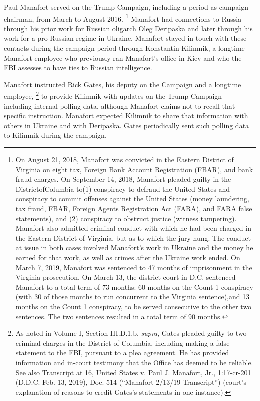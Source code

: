 Paul Manafort served on the Trump Campaign, including a period as campaign chairman, from March to August 2016.%
\footnote{On August 21, 2018, Manafort was convicted in the Eastern District of Virginia on eight tax, Foreign Bank Account Registration (FBAR), and bank fraud charges. On September 14, 2018, Manafort pleaded guilty in the DistrictofColumbia to(1) conspiracy to defraud the United States and conspiracy to commit offenses against the United States (money laundering, tax fraud, FBAR, Foreign Agents Registration Act (FARA), and FARA false statements), and (2) conspiracy to obstruct justice (witness tampering).
Manafort also admitted criminal conduct with which he had been charged in the Eastern District of Virginia, but as to which the jury hung.
The conduct at issue in both cases involved Manafort’s work in Ukraine and the money he earned for that work, as well as crimes after the Ukraine work ended. On March 7, 2019, Manafort was sentenced to 47 months of imprisonment in the Virginia prosecution.
On March 13, the district court in D.C. sentenced Manafort to a total term of 73 months: 60 months on the Count 1 conspiracy (with 30 of those months to run concurrent to the Virginia sentence),and 13 months on the Count 1 conspiracy, to be served consecutive to the other two sentences.
The two sentences resulted in a total term of 90 months.
}
Manafort had connections to Russia through his prior work for Russian oligarch Oleg Deripaska and later through his work for a pro-Russian regime in Ukraine.
Manafort stayed in touch with these contacts during the campaign period through Konstantin Kilimnik, a longtime Manafort employee who previously ran Manafort's office in Kiev and who the FBI assesses to have ties to Russian intelligence.

Manafort instructed Rick Gates, his deputy on the Campaign and a longtime employee, %
\footnote{As noted in Volume I, Section III.D.1.b, \textit{supra}, Gates pleaded guilty to two criminal charges in the District of Columbia, including making a false statement to the FBI, pursuant to a plea agreement.
He has provided information and in-court testimony that the Office has deemed to be reliable. See also Transcript at 16, United States v. Paul J. Manafort, Jr., 1:17-cr-201 (D.D.C. Feb. 13, 2019), Doc.
514 (“Manafort 2/13/19 Transcript”) (court’s explanation of reasons to credit Gates’s statements in one instance).}
to provide Kilimnik with updates on the Trump Campaign - including internal polling data, although Manafort claims not to recall that specific instruction.
Manafort expected Kilimnik to share that information with others in Ukraine and with Deripaska.
Gates periodically sent such polling data to Kilimnik during the campaign.

